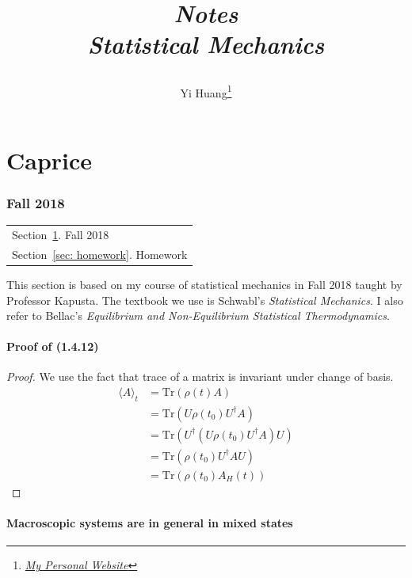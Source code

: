 \documentclass[10pt]{article}
\title{\begin{center}{\Huge \textit{Notes}}\\{{\itshape Statistical Mechanics}}\end{center}}
\author{Yi Huang\footnote{\href{https://yiihuang.com/}{\textit{My Personal Website}}}}
\affiliation{
University of Minnesota
}
\begin{document}
	\maketitle
	\flushbottom
	\newpage
	\pagestyle{fancynotes}
	\part{Caprice}
	\section{Fall 2018}\label{sec: fall2018}
	\begin{margintable}\vspace{.8in}\footnotesize
		\begin{tabularx}{\marginparwidth}{|X}
			Section~\ref{sec: fall2018}. Fall 2018\\
			Section~\ref{sec: homework}. Homework\\
		\end{tabularx}
	\end{margintable}

	This section is based on my course of statistical mechanics in Fall 2018 taught by Professor Kapusta. The textbook we use is Schwabl's \textit{Statistical Mechanics}. I also refer to Bellac's \textit{Equilibrium and Non-Equilibrium Statistical Thermodynamics}.

	\subsection{Proof of (1.4.12)}
	\begin{proof}
		We use the fact that trace of a matrix is invariant under change of basis.
		\begin{align*}
		\langle A \rangle_t &= \mathrm{Tr}(\rho(t) A) \\
		&= \mathrm{Tr}(U \rho(t_0) U^{\dagger} A) \\
		&= \mathrm{Tr}(U^{\dagger} (U \rho(t_0) U^{\dagger} A) U) \\
		&= \mathrm{Tr}(\rho(t_0) U^{\dagger} A U) \\
		&= \mathrm{Tr}(\rho(t_0) A_H(t))
		\end{align*}
	\end{proof}

	\subsection{Macroscopic systems are in general in mixed states}
\end{document}
